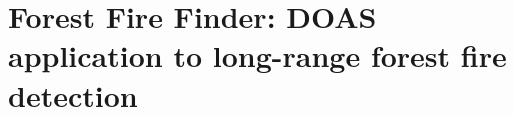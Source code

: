 \chapter{Forest Fire Finder: DOAS application to long-range forest fire
detection}
\label{ap:fff_paper}



